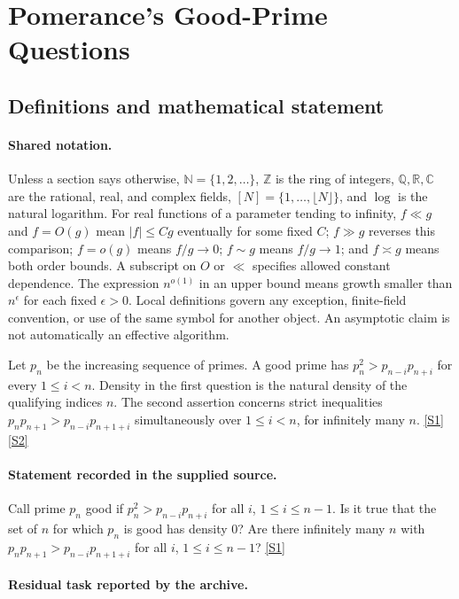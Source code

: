\documentclass[11pt,a4paper]{article}
\newcommand{\N}{\mathbb{N}}
\newcommand{\Z}{\mathbb{Z}}
\newcommand{\Q}{\mathbb{Q}}
\newcommand{\R}{\mathbb{R}}
\newcommand{\C}{\mathbb{C}}
\newcommand{\sref}[2]{\hyperlink{source:#1:#2}{[S#2]}}
\begin{document}
\section{Pomerance’s Good-Prime Questions}\label{statement}


\subsection{Definitions and mathematical statement}

\paragraph{Shared notation.}Unless a section says otherwise, $\N=\{1,2,\ldots\}$,
$\Z$ is the ring of integers, $\Q,\R,\C$ are the rational, real, and complex
fields, $[N]=\{1,\ldots,\lfloor N\rfloor\}$, and $\log$ is the natural
logarithm. For real functions of a parameter tending to infinity,
$f\ll g$ and $f=O(g)$ mean $|f|\leq Cg$ eventually for some fixed $C$;
$f\gg g$ reverses this comparison; $f=o(g)$ means $f/g\to0$;
$f\sim g$ means $f/g\to1$; and $f\asymp g$ means both order bounds.
A subscript on $O$ or $\ll$ specifies allowed constant dependence.
The expression $n^{o(1)}$ in an upper bound means growth smaller than
$n^\epsilon$ for each fixed $\epsilon>0$. Local definitions govern any
exception, finite-field convention, or use of the same symbol for another
object. An asymptotic claim is not automatically an effective algorithm.



Let $p_n$ be the increasing sequence of primes. A good prime has $p_n^2>p_{n-i}p_{n+i}$ for every $1\leq i<n$. Density in the first question is the natural density of the qualifying indices $n$. The second assertion concerns strict inequalities $p_np_{n+1}>p_{n-i}p_{n+1+i}$ simultaneously over $1\leq i<n$, for infinitely many $n$. \sref{statement}{1} \sref{statement}{2}

\paragraph{Statement recorded in the supplied source.}
Call prime $p_n$ good if $p_n^2 > p_{n-i}p_{n+i}$ for all $i$, $1 \le i \le n-1$. Is it true that the set of $n$ for which $p_n$ is good has density 0? Are there infinitely many $n$ with $p_n p_{n+1} > p_{n-i} p_{n+1+i}$ for all $i$, $1 \le i \le n-1$? \sref{statement}{1}

\paragraph{Residual task reported by the archive.}
\end{document}
